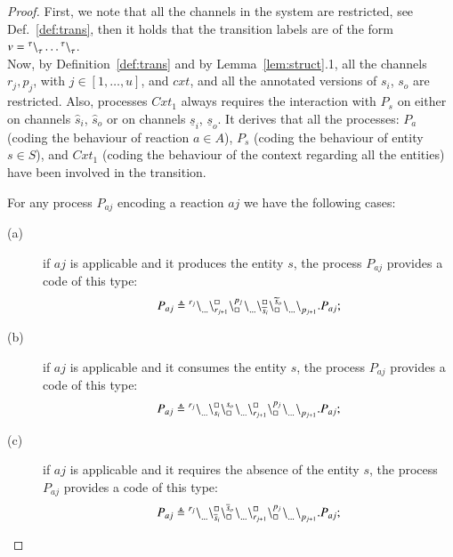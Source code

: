  \begin{proof}
 First, we note that all the channels in the system are restricted, see Def.~\ref{def:trans}, then
 it holds that the transition labels are of the form  $v={}^{\tau} \backslash_{\tau}^{}\dots{}^{\tau} \backslash_{\tau}^{}$.\\
 Now,
by Definition~\ref{def:trans} and by Lemma~\ref{lem:struct}.1, all the  channels $r_j,p_j$, with
 $j \in [1,\dots,u]$, and $cxt$,
  and all the annotated versions of 
 $s_i$, $s_o$ are restricted. Also, processes $\mathit{Cxt}_1$ always requires the 
 interaction with $P_s$ on either on channels $\widehat{s}_i$, $\widehat{s}_o$ or on channels 
 $\underline{s}_i$, $\underline{s}_o$.
 It derives that all the processes: $P_a$  (coding the behaviour of reaction $a \in A$), $P_s$ (coding the behaviour of entity $s \in S$), and $\mathit{Cxt}_1$ (coding the behaviour of the context regarding all the entities) have been involved in the transition. 

For any process $P_{aj}$ encoding a reaction $aj$ we have the following cases:
\begin{description}
\item[(a)] 
if $aj$ is applicable and it produces the entity $s$,  
the process $P_{aj}$ provides a code of this type:
$$P_{aj}\triangleq {}^{r_j} \backslash_{\dots}^{}\backslash_{r_{j+1}}^{\scriptstyle {\square}}\backslash_{\scriptstyle {\square}}^{p_j}{}^{} \backslash_{\dots}^{}\backslash_{\widetilde{s}_i}^{\scriptstyle {\square}}\backslash_{\scriptstyle {\square}}^{\widetilde{s}_o}{}^{} \backslash_{\dots}^{} \backslash_{p_{j+1}}^{}.P_{aj} ;$$

\item[(b)] 
 if $aj$ is applicable and it  consumes the entity $s$,
 the process $P_{aj}$ provides a code of this type: 
$$P_{aj}\triangleq {}^{r_j} \backslash_{\dots}^{}\backslash_{s_i}^{\scriptstyle {\square}}\backslash_{\scriptstyle {\square}}^{s_o}{}^{} \backslash_{\dots}^{} \backslash_{r_{j+1}}^{\scriptstyle {\square}}\backslash_{\scriptstyle {\square}}^{p_j}{}^{} \backslash_{\dots}^{}{}^{} \backslash_{p_{j+1}}^{}.P_{aj} ;$$

\item[(c)]  
 if $aj$ is applicable and it requires the absence of the entity $s$,
 the process $P_{aj}$  provides a code of this type: 
$$P_{aj}\triangleq {}^{r_j} \backslash_{\dots}^{}\backslash_{\overline{s}_i}^{\scriptstyle {\square}}\backslash_{\scriptstyle {\square}}^{\overline{s}_o}{}^{} \backslash_{\dots}^{} \backslash_{r_{j+1}}^{\scriptstyle {\square}}\backslash_{\scriptstyle {\square}}^{p_j}{}^{} \backslash_{\dots}^{}{}^{} \backslash_{p_{j+1}}^{}.P_{aj} ;$$


\end{description}
\end{proof}
